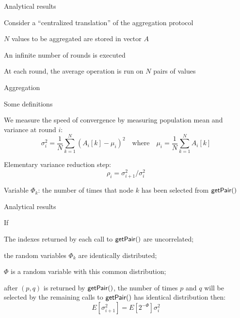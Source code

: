 \begin{frame}{Analytical results}

\BI
\item Consider a “centralized translation” of the aggregation protocol
\item $N$ values to be aggregated are stored in vector $A$
\item An infinite number of rounds is executed 
\item At each round, the average operation is run on $N$ pairs of values
\EI

\smallskip
\begin{Procedure}
\caption{Aggregation}

\end{Procedure}

\end{frame}

\begin{frame}{Some definitions}

\BIL
\item We measure the speed of convergence by measuring population mean
and variance at round $i$:
\[
\sigma_i^2 = \frac{1}{N} \sum_{k=1}^N (A_i[k] - \mu_i)^2
\quad \textrm{where} \quad
\mu_i = \frac{1}{N} \sum_{k=1}^N A_i[k] 
\]
\item Elementary variance reduction step:
\[
  \rho_i = {\sigma_{i+1}^2}/{\sigma^2_i} 
\]
\item Variable $\Phi_k$: the number of times that node $k$ has been selected from $\mathsf{getPair}()$
\EIL


\end{frame}	

\begin{frame}{Analytical results}

\begin{theorem}[Convergence]
If
\BE
\item The indexes returned by each call to $\mathsf{getPair}()$ are uncorrelated;
\item the random variables $\Phi_k$ are identically distributed;
\item $\Phi$ is a random variable with this common distribution;
\item after $(p, q)$ is returned by $\mathsf{getPair}()$, the number of times $p$ and $q$ 
will be selected by the remaining calls to $\mathsf{getPair}()$ has identical distribution
\EE
then:
\[
  E[\sigma^2_{i+1}] = E[2^{-\Phi}] \sigma_i^2
\]	
\end{theorem}


\end{frame}

